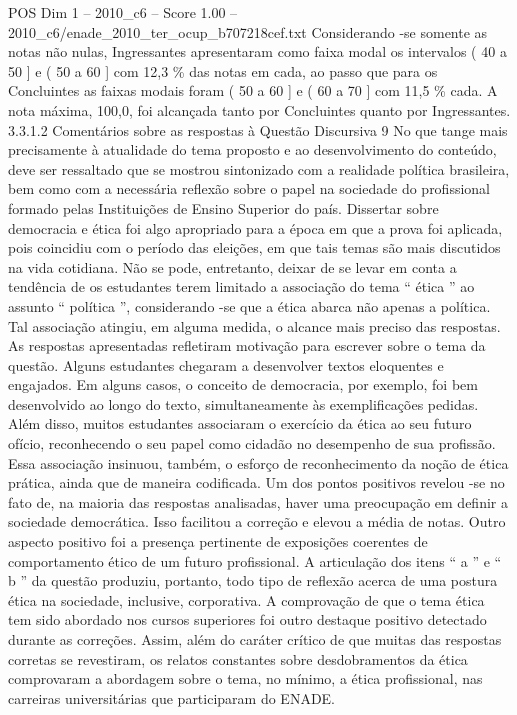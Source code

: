 \begin{textsample}{POS Dim 1 – 2010\_c6 – Score 1.00 – 2010\_c6/enade\_2010\_ter\_ocup\_b707218cef.txt}
Considerando -se somente as notas não nulas, Ingressantes apresentaram como faixa modal os intervalos ( 40 a 50 ] e ( 50 a 60 ] com 12,3 \% das notas em cada, ao passo que para os Concluintes as faixas modais foram ( 50 a 60 ] e ( 60 a 70 ] com 11,5 \% cada.
A nota máxima, 100,0, foi alcançada tanto por Concluintes quanto por Ingressantes. 3.3.1.2 Comentários sobre as respostas à Questão Discursiva 9 No que tange mais precisamente à atualidade do tema proposto e ao desenvolvimento do conteúdo, deve ser ressaltado que se mostrou sintonizado com a realidade política brasileira, bem como com a necessária reflexão sobre o papel na sociedade do profissional formado pelas Instituições de Ensino Superior do país.
Dissertar sobre democracia e ética foi algo apropriado para a época em que a prova foi aplicada, pois coincidiu com o período das eleições, em que tais temas são mais discutidos na vida cotidiana.
Não se pode, entretanto, deixar de se levar em conta a tendência de os estudantes terem limitado a associação do tema “ ética ” ao assunto “ política ”, considerando -se que a ética abarca não apenas a política.
Tal associação atingiu, em alguma medida, o alcance mais preciso das respostas.
As respostas apresentadas refletiram motivação para escrever sobre o tema da questão.
Alguns estudantes chegaram a desenvolver textos eloquentes e engajados.
Em alguns casos, o conceito de democracia, por exemplo, foi bem desenvolvido ao longo do texto, simultaneamente às exemplificações pedidas.
Além disso, muitos estudantes associaram o exercício da ética ao seu futuro ofício, reconhecendo o seu papel como cidadão no desempenho de sua profissão.
Essa associação insinuou, também, o esforço de reconhecimento da noção de ética prática, ainda que de maneira codificada.
Um dos pontos positivos revelou -se no fato de, na maioria das respostas analisadas, haver uma preocupação em definir a sociedade democrática.
Isso facilitou a correção e elevou a média de notas.
Outro aspecto positivo foi a presença pertinente de exposições coerentes de comportamento ético de um futuro profissional.
A articulação dos itens “ a ” e “ b ” da questão produziu, portanto, todo tipo de reflexão acerca de uma postura ética na sociedade, inclusive, corporativa.
A comprovação de que o tema ética tem sido abordado nos cursos superiores foi outro destaque positivo detectado durante as correções.
Assim, além do caráter crítico de que muitas das respostas corretas se revestiram, os relatos constantes sobre desdobramentos da ética comprovaram a abordagem sobre o tema, no mínimo, a ética profissional, nas carreiras universitárias que participaram do ENADE.

\end{textsample}

